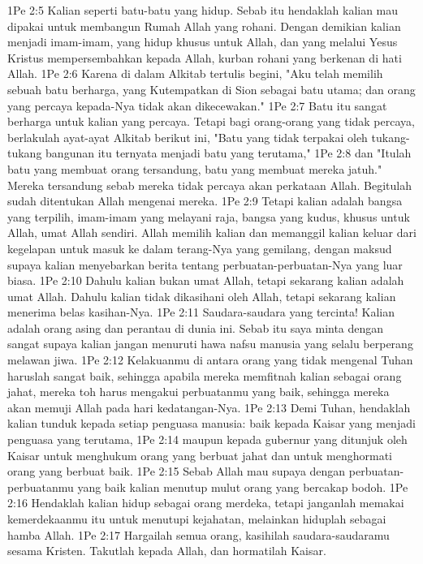 1Pe 2:5  Kalian seperti batu-batu yang hidup. Sebab itu hendaklah kalian mau dipakai untuk membangun Rumah Allah yang rohani. Dengan demikian kalian menjadi imam-imam, yang hidup khusus untuk Allah, dan yang melalui Yesus Kristus mempersembahkan kepada Allah, kurban rohani yang berkenan di hati Allah.
1Pe 2:6  Karena di dalam Alkitab tertulis begini, "Aku telah memilih sebuah batu berharga, yang Kutempatkan di Sion sebagai batu utama; dan orang yang percaya kepada-Nya tidak akan dikecewakan."
1Pe 2:7  Batu itu sangat berharga untuk kalian yang percaya. Tetapi bagi orang-orang yang tidak percaya, berlakulah ayat-ayat Alkitab berikut ini, "Batu yang tidak terpakai oleh tukang-tukang bangunan itu ternyata menjadi batu yang terutama,"
1Pe 2:8  dan "Itulah batu yang membuat orang tersandung, batu yang membuat mereka jatuh." Mereka tersandung sebab mereka tidak percaya akan perkataan Allah. Begitulah sudah ditentukan Allah mengenai mereka.
1Pe 2:9  Tetapi kalian adalah bangsa yang terpilih, imam-imam yang melayani raja, bangsa yang kudus, khusus untuk Allah, umat Allah sendiri. Allah memilih kalian dan memanggil kalian keluar dari kegelapan untuk masuk ke dalam terang-Nya yang gemilang, dengan maksud supaya kalian menyebarkan berita tentang perbuatan-perbuatan-Nya yang luar biasa.
1Pe 2:10  Dahulu kalian bukan umat Allah, tetapi sekarang kalian adalah umat Allah. Dahulu kalian tidak dikasihani oleh Allah, tetapi sekarang kalian menerima belas kasihan-Nya.
1Pe 2:11  Saudara-saudara yang tercinta! Kalian adalah orang asing dan perantau di dunia ini. Sebab itu saya minta dengan sangat supaya kalian jangan menuruti hawa nafsu manusia yang selalu berperang melawan jiwa.
1Pe 2:12  Kelakuanmu di antara orang yang tidak mengenal Tuhan haruslah sangat baik, sehingga apabila mereka memfitnah kalian sebagai orang jahat, mereka toh harus mengakui perbuatanmu yang baik, sehingga mereka akan memuji Allah pada hari kedatangan-Nya.
1Pe 2:13  Demi Tuhan, hendaklah kalian tunduk kepada setiap penguasa manusia: baik kepada Kaisar yang menjadi penguasa yang terutama,
1Pe 2:14  maupun kepada gubernur yang ditunjuk oleh Kaisar untuk menghukum orang yang berbuat jahat dan untuk menghormati orang yang berbuat baik.
1Pe 2:15  Sebab Allah mau supaya dengan perbuatan-perbuatanmu yang baik kalian menutup mulut orang yang bercakap bodoh.
1Pe 2:16  Hendaklah kalian hidup sebagai orang merdeka, tetapi janganlah memakai kemerdekaanmu itu untuk menutupi kejahatan, melainkan hiduplah sebagai hamba Allah.
1Pe 2:17  Hargailah semua orang, kasihilah saudara-saudaramu sesama Kristen. Takutlah kepada Allah, dan hormatilah Kaisar.
